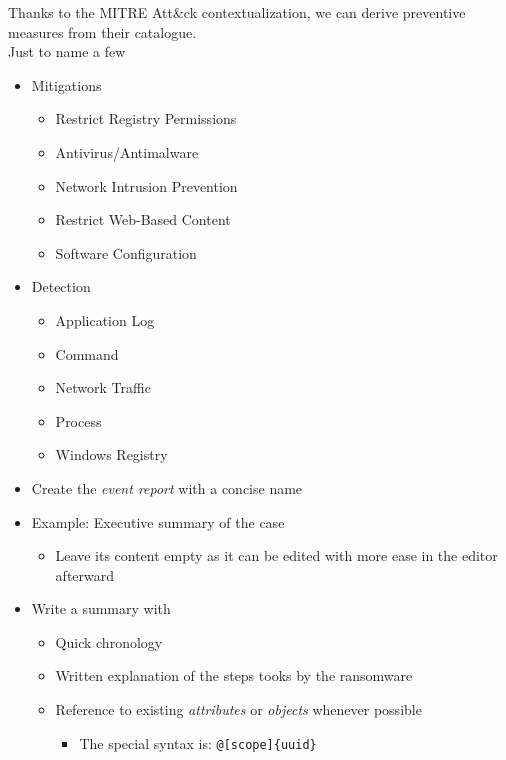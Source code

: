 \begin{frame}
    Thanks to the MITRE Att\&ck contextualization, we can derive preventive measures from their catalogue.\\

    Just to name a few
    \begin{itemize}
        \item Mitigations
        \begin{itemize}
            \item Restrict Registry Permissions
            \item Antivirus/Antimalware
            \item Network Intrusion Prevention
            \item Restrict Web-Based Content
            \item Software Configuration
        \end{itemize}
        \item Detection
        \begin{itemize}
            \item Application Log
            \item Command
            \item Network Traffic
            \item Process
            \item Windows Registry
        \end{itemize}
    \end{itemize}
\end{frame}

\begin{frame}
    \begin{itemize}
        \item Create the \textit{event report} with a concise name
        \item Example: Executive summary of the case
        \begin{itemize}
            \item Leave its content empty as it can be edited with more ease in the editor afterward
        \end{itemize}
        \item Write a summary with
        \begin{itemize}
            \item Quick chronology
            \item Written explanation of the steps tooks by the ransomware
            \item Reference to existing \textit{attributes} or \textit{objects} whenever possible
            \begin{itemize}
                \item The special syntax is: \texttt{@[scope]\{uuid\}}
            \end{itemize}
        \end{itemize}
    \end{itemize}
\end{frame}

